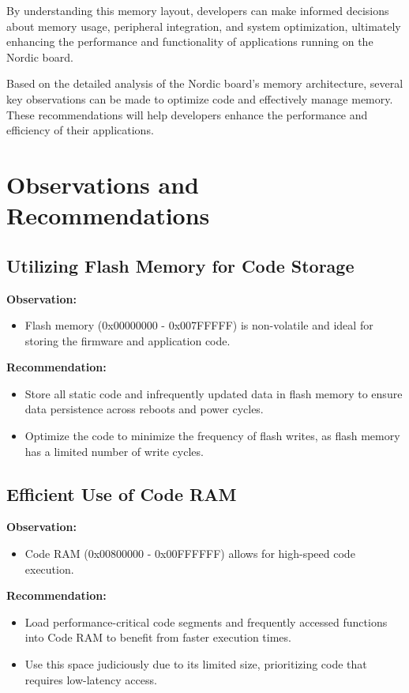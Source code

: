\documentclass{Configuration_Files/PoliMi3i_thesis}
\begin{document}
By understanding this memory layout, developers can make informed decisions about memory usage, peripheral integration, and system optimization, ultimately enhancing the performance and functionality of applications running on the Nordic board.

Based on the detailed analysis of the Nordic board's memory architecture, several key observations can be made to optimize code and effectively manage memory. These recommendations will help developers enhance the performance and efficiency of their applications.

\section{Observations and Recommendations}

\subsection{Utilizing Flash Memory for Code Storage}
\textbf{Observation:}
\begin{itemize}
    \item Flash memory (0x00000000 - 0x007FFFFF) is non-volatile and ideal for storing the firmware and application code.
\end{itemize}

\textbf{Recommendation:}
\begin{itemize}
    \item Store all static code and infrequently updated data in flash memory to ensure data persistence across reboots and power cycles.
    \item Optimize the code to minimize the frequency of flash writes, as flash memory has a limited number of write cycles.
\end{itemize}

\subsection{Efficient Use of Code RAM}
\textbf{Observation:}
\begin{itemize}
    \item Code RAM (0x00800000 - 0x00FFFFFF) allows for high-speed code execution.
\end{itemize}

\textbf{Recommendation:}
\begin{itemize}
    \item Load performance-critical code segments and frequently accessed functions into Code RAM to benefit from faster execution times.
    \item Use this space judiciously due to its limited size, prioritizing code that requires low-latency access.
\end{itemize}
\end{document}

